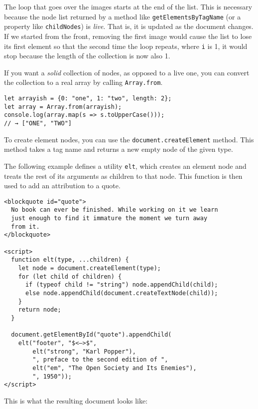 The loop that goes over the images starts at the end of the list. This is necessary because the node list returned by a method like \lstinline`getElementsByTagName` (or a property like \lstinline`childNodes`) is \emph{live}. That is, it is updated as the document changes. If we started from the front, removing the first image would cause the list to lose its first element so that the second time the loop repeats, where \lstinline`i` is 1, it would stop because the length of the collection is now also 1.

If you want a \emph{solid} collection of nodes, as opposed to a live one, you can convert the collection to a real array by calling \lstinline`Array.from`.

\begin{lstlisting}
let arrayish = {0: "one", 1: "two", length: 2};
let array = Array.from(arrayish);
console.log(array.map(s => s.toUpperCase()));
// → ["ONE", "TWO"]
\end{lstlisting}
\noindent{}

To create element nodes, you can use the \lstinline`document.createElement` method. This method takes a tag name and returns a new empty node of the given type.

\label{dom.elt}The following example defines a utility \lstinline`elt`, which creates an element node and treats the rest of its arguments as children to that node. This function is then used to add an attribution to a quote.

\begin{lstlisting}
<blockquote id="quote">
  No book can ever be finished. While working on it we learn
  just enough to find it immature the moment we turn away
  from it.
</blockquote>

<script>
  function elt(type, ...children) {
    let node = document.createElement(type);
    for (let child of children) {
      if (typeof child != "string") node.appendChild(child);
      else node.appendChild(document.createTextNode(child));
    }
    return node;
  }

  document.getElementById("quote").appendChild(
    elt("footer", "$<—>$",
        elt("strong", "Karl Popper"),
        ", preface to the second edition of ",
        elt("em", "The Open Society and Its Enemies"),
        ", 1950"));
</script>
\end{lstlisting}
\noindent

This is what the resulting document looks like:

